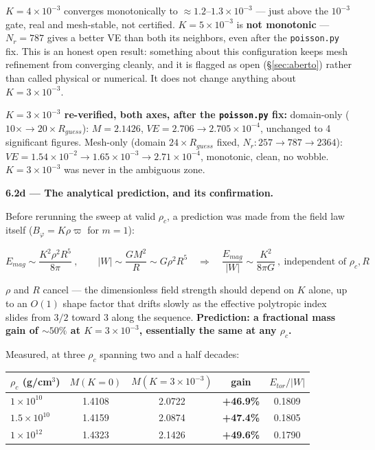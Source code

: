\documentclass[11pt,a4paper]{scrartcl}
\newcommand{\code}[1]{\texttt{\small #1}}
\begin{document}
$K=4\times10^{-3}$ converges monotonically to $\approx1.2$--$1.3
\times10^{-3}$ --- just above the $10^{-3}$ gate, real and mesh-stable,
not certified. $K=5\times10^{-3}$ is \textbf{not monotonic} ---
$N_r=787$ gives a better VE than both its neighbors, even after the
\code{poisson.py} fix. This is an honest open result: something about
this configuration keeps mesh refinement from converging cleanly, and
it is flagged as open (\S\ref{sec:aberto}) rather than called physical
or numerical. It does not change anything about $K=3\times10^{-3}$.

\textbf{$K=3\times10^{-3}$ re-verified, both axes, after the
\code{poisson.py} fix:} domain-only ($10\times\to20\times R_{guess}$):
$M=2.1426$, $VE=2.706\to2.705\times10^{-4}$, unchanged to 4 significant
figures. Mesh-only (domain $24\times R_{guess}$ fixed, $N_r:
257\to787\to2364$): $VE=1.54\times10^{-2}\to1.65\times10^{-3}
\to2.71\times10^{-4}$, monotonic, clean, no wobble. $K=3\times10^{-3}$
was never in the ambiguous zone.

\medskip\noindent\textbf{6.2d --- The analytical prediction, and its confirmation.}

Before rerunning the sweep at valid $\rho_c$, a prediction was made
from the field law itself ($B_\varphi=K\rho\varpi$ for $m=1$):

\[
E_{mag}\sim\frac{K^2\rho^2 R^5}{8\pi}\ ,\qquad
|W|\sim\frac{GM^2}{R}\sim G\rho^2R^5
\quad\Longrightarrow\quad
\frac{E_{mag}}{|W|}\sim\frac{K^2}{8\pi G}\ ,\ \text{independent of } \rho_c, R
\]

$\rho$ and $R$ cancel --- the dimensionless field strength should
depend on $K$ alone, up to an $O(1)$ shape factor that drifts slowly as
the effective polytropic index slides from $3/2$ toward $3$ along the
sequence. \textbf{Prediction: a fractional mass gain of $\sim50\%$ at
$K=3\times10^{-3}$, essentially the same at any $\rho_c$.}

Measured, at three $\rho_c$ spanning two and a half decades:

\begin{center}
\begin{tabular}{@{}lcccc@{}}
\toprule
$\rho_c$ (g/cm$^3$) & $M(K{=}0)$ & $M(K{=}3{\times}10^{-3})$ & gain & $E_{tor}/|W|$\\
\midrule
$1\times10^{10}$ & 1.4108 & 2.0722 & \textbf{+46.9\%} & 0.1809\\
$1.5\times10^{10}$ & 1.4159 & 2.0874 & \textbf{+47.4\%} & 0.1805\\
$1\times10^{12}$ & 1.4323 & 2.1426 & \textbf{+49.6\%} & 0.1790\\
\bottomrule
\end{tabular}
\end{center}
\end{document}
